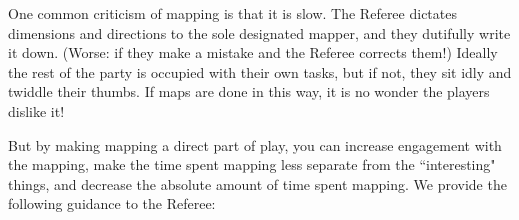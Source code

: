 \documentclass[twoside]{article}
\begin{document}
\bigbreak

One common criticism of mapping is that it is slow. The Referee dictates dimensions and directions to the sole designated mapper, and they dutifully write it down. (Worse: if they make a mistake and the Referee corrects them!) Ideally the rest of the party is occupied with their own tasks, but if not, they sit idly and twiddle their thumbs. If maps are done in this way, it is no wonder the players dislike it!

\bigbreak

But by making mapping a direct part of play, you can increase engagement with the mapping, make the time spent mapping less separate from the ``interesting" things, and decrease the absolute amount of time spent mapping. We provide the following guidance to the Referee:
\end{document}
